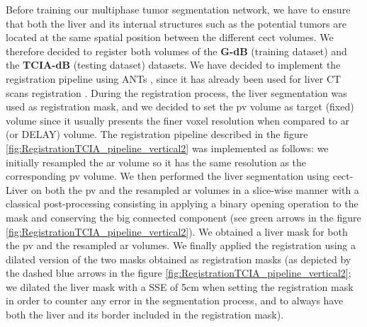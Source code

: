 \documentclass[]{article}
\newcommand{\pplfont}[1]{{\fontfamily{ppl}\selectfont #1}}
\newcommand{\lmttfont}[1]{{\fontfamily{lmtt}\selectfont #1}}
\begin{document}
Before training our multiphase tumor segmentation network, we have to ensure that both the liver and its internal structures such as the potential tumors are located at the same spatial position between
the different \ac{cect} volumes. We therefore decided to register both volumes of the \textbf{\lmttfont{G-dB}} (training dataset) and the \textbf{\lmttfont{TCIA-dB}} (testing dataset) datasets.
We have decided to implement the registration pipeline using ANTs \cite{avants2009advanced}, since it has already been used for liver
CT scans registration \cite{Zhao2019,Zhao2020}.
During the registration process, the liver segmentation was used as
registration mask, and we decided to set the \ac{pv} volume as target (fixed)
volume since it usually presents the finer voxel resolution when
compared to \ac{ar} (or DELAY) volume. The registration pipeline described in the figure \ref{fig:RegistrationTCIA_pipeline_vertical2} was implemented as follows: we initially resampled the \ac{ar} volume so it has the same resolution as the corresponding \ac{pv} volume. We then performed the liver segmentation using \pplfont{\ac{cect}-Liver} on both the \ac{pv} and the resampled \ac{ar} volumes in a slice-wise manner with a classical post-processing consisting in applying a binary opening operation to the mask and conserving the big connected component (see green arrows in the figure \ref{fig:RegistrationTCIA_pipeline_vertical2}). We obtained a liver mask for both the \ac{pv} and the resampled \ac{ar} volumes. We finally applied the registration using a dilated version of the two masks obtained as registration masks (as depicted by the dashed blue arrows in the figure \ref{fig:RegistrationTCIA_pipeline_vertical2}; we dilated the liver mask with a SSE of 5cm when setting the registration mask in order to counter any error in the segmentation process, and to always have both the liver and its border included in the registration mask).
\end{document}
